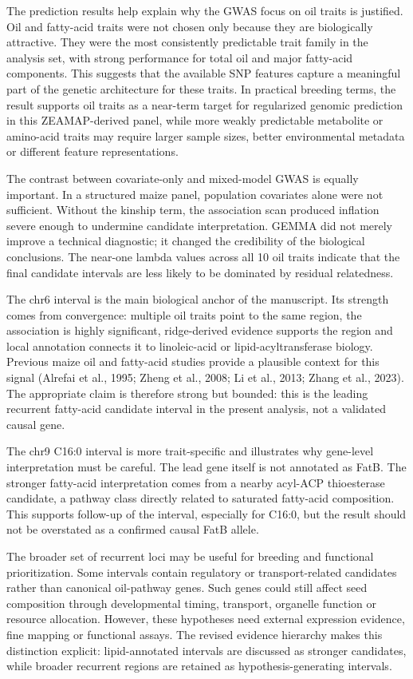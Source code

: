 \documentclass[
]{article}
\begin{document}
The prediction results help explain why the GWAS focus on oil traits is
justified. Oil and fatty-acid traits were not chosen only because they
are biologically attractive. They were the most consistently predictable
trait family in the analysis set, with strong performance for total oil
and major fatty-acid components. This suggests that the available SNP
features capture a meaningful part of the genetic architecture for these
traits. In practical breeding terms, the result supports oil traits as a
near-term target for regularized genomic prediction in this
ZEAMAP-derived panel, while more weakly predictable metabolite or
amino-acid traits may require larger sample sizes, better environmental
metadata or different feature representations.

The contrast between covariate-only and mixed-model GWAS is equally
important. In a structured maize panel, population covariates alone were
not sufficient. Without the kinship term, the association scan produced
inflation severe enough to undermine candidate interpretation. GEMMA did
not merely improve a technical diagnostic; it changed the credibility of
the biological conclusions. The near-one lambda values across all 10 oil
traits indicate that the final candidate intervals are less likely to be
dominated by residual relatedness.

The chr6 interval is the main biological anchor of the manuscript. Its
strength comes from convergence: multiple oil traits point to the same
region, the association is highly significant, ridge-derived evidence
supports the region and local annotation connects it to linoleic-acid or
lipid-acyltransferase biology. Previous maize oil and fatty-acid studies
provide a plausible context for this signal (Alrefai et al., 1995; Zheng
et al., 2008; Li et al., 2013; Zhang et al., 2023). The appropriate
claim is therefore strong but bounded: this is the leading recurrent
fatty-acid candidate interval in the present analysis, not a validated
causal gene.

The chr9 C16:0 interval is more trait-specific and illustrates why
gene-level interpretation must be careful. The lead gene itself is not
annotated as FatB. The stronger fatty-acid interpretation comes from a
nearby acyl-ACP thioesterase candidate, a pathway class directly related
to saturated fatty-acid composition. This supports follow-up of the
interval, especially for C16:0, but the result should not be overstated
as a confirmed causal FatB allele.

The broader set of recurrent loci may be useful for breeding and
functional prioritization. Some intervals contain regulatory or
transport-related candidates rather than canonical oil-pathway genes.
Such genes could still affect seed composition through developmental
timing, transport, organelle function or resource allocation. However,
these hypotheses need external expression evidence, fine mapping or
functional assays. The revised evidence hierarchy makes this distinction
explicit: lipid-annotated intervals are discussed as stronger
candidates, while broader recurrent regions are retained as
hypothesis-generating intervals.
\end{document}
